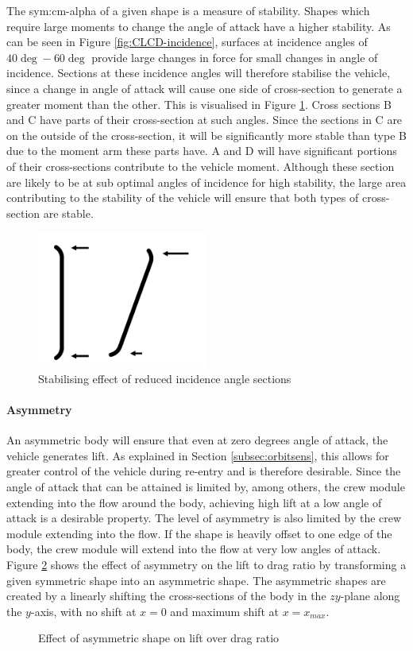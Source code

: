 The \gls{sym:cm-alpha} of a given shape is a measure of stability. Shapes which require large moments to change the angle of attack have a higher stability. As can be seen in Figure \ref{fig:CLCD-incidence}, surfaces at incidence angles of $40\deg-60\deg$ provide large changes in force for small changes in angle of incidence. Sections at these incidence angles will therefore stabilise the vehicle, since a change in angle of attack will cause one side of cross-section to generate a greater moment than the other. This is visualised in Figure \ref{fig:StabMom}. Cross sections B and C have parts of their cross-section at such angles. Since the sections in C are on the outside of the cross-section, it will be significantly more stable than type B due to the moment arm these parts have. A and D will have significant portions of their cross-sections contribute to the vehicle moment. Although these section are likely to be at sub optimal angles of incidence for high stability, the large area contributing to the stability of the vehicle will ensure that both types of cross-section are stable. 

\begin{figure}[h]
	\centering
	\includegraphics[width=0.5\textwidth]{./Figure/Aerodynamics/StabilizeMoment.pdf}
	\caption{Stabilising effect of reduced incidence angle sections}
	\label{fig:StabMom}
\end{figure}

\paragraph{Asymmetry}
An asymmetric body will ensure that even at zero degrees angle of attack, the vehicle generates lift. As explained in Section \ref{subsec:orbitsens}, this allows for greater control of the vehicle during re-entry and is therefore desirable. Since the angle of attack that can be attained is limited by, among others, the crew module extending into the flow around the body, achieving high lift at a low angle of attack is a desirable property. The level of asymmetry is also limited by the crew module extending into the flow. If the shape is heavily offset to one edge of the body, the crew module will extend into the flow at very low angles of attack. Figure \ref{fig:LDSkew} shows the effect of asymmetry on the lift to drag ratio by transforming a given symmetric shape into an asymmetric shape. The asymmetric shapes are created by a linearly shifting the cross-sections of the body in the $zy$-plane along the $y$-axis, with no shift at $x=0$ and maximum shift at $x=x_{max}$. 

\begin{figure}[h]
	\centering
	\setlength{} 
	\setlength{}
	
	\caption{Effect of asymmetric shape on lift over drag ratio}
	\label{fig:LDSkew}
\end{figure}